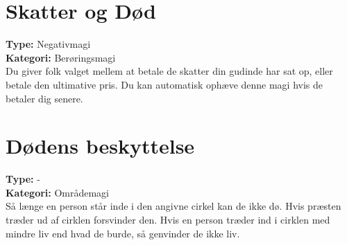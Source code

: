 \section{Skatter og Død}
\textbf{Type:} Negativmagi\\ 
\textbf{Kategori:} Berøringsmagi\\
Du giver folk valget mellem at betale de skatter din gudinde har sat op, eller betale den ultimative pris. Du kan automatisk ophæve denne magi hvis de betaler dig senere.\\


\section{Dødens beskyttelse}
\textbf{Type:} - \\
\textbf{Kategori:} Områdemagi\\
Så længe en person står inde i den angivne cirkel kan de ikke dø. Hvis præsten træder ud af cirklen forsvinder den. Hvis en person træder ind i cirklen med mindre liv end hvad de burde, så genvinder de ikke liv.

